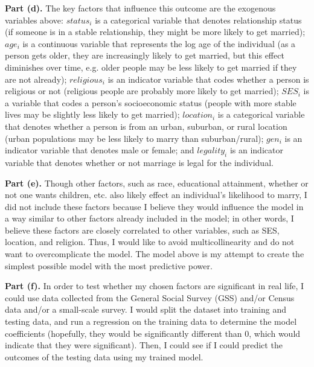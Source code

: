 \documentclass[letterpaper,12pt]{article}
\theoremstyle{definition}
\begin{document}
\textbf{Part (d).} The key factors that influence this outcome are the exogenous variables above: $status_i$ is a categorical variable that denotes relationship status (if someone is in a stable relationship, they might be more likely to get married); $age_i$ is a continuous variable that represents the log age of the individual (as a person gets older, they are increasingly likely to get married, but this effect diminishes over time, e.g. older people may be less likely to get married if they are not already); $religious_i$ is an indicator variable that codes whether a person is religious or not (religious people are probably more likely to get married); $SES_i$ is a variable that codes a person's socioeconomic status (people with more stable lives may be slightly less likely to get married); $location_i$ is a categorical variable that denotes whether a person is from an urban, suburban, or rural location (urban populations may be less likely to marry than suburban/rural); $gen_i$ is an indicator variable that denotes male or female; and $legality_i$ is an indicator variable that denotes whether or not marriage is legal for the individual.

\textbf{Part (e).} Though other factors, such as race, educational attainment, whether or not one wants children, etc. also likely effect an individual's likelihood to marry, I did not include these factors because I believe they would influence the model in a way similar to other factors already included in the model; in other words, I believe these factors are closely correlated to other variables, such as SES, location, and religion. Thus, I would like to avoid multicollinearity and do not want to overcomplicate the model. The model above is my attempt to create the simplest possible model with the most predictive power.

\textbf{Part (f).} In order to test whether my chosen factors are significant in real life, I could use data collected from the General Social Survey (GSS) and/or Census data and/or a small-scale survey. I would split the dataset into training and testing data, and run a regression on the training data to determine the model coefficients (hopefully, they would be significantly different than 0, which would indicate that they were significant). Then, I could see if I could predict the outcomes of the testing data using my trained model.
\end{document}
